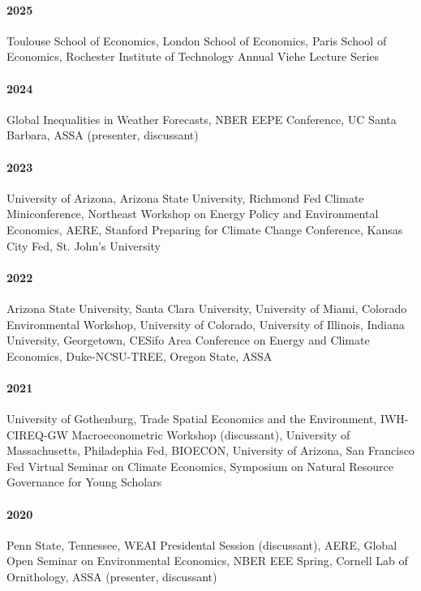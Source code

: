 \documentclass[11pt]{res} %
\begin{document}
\begin{resume}
\paragraph{2025} Toulouse School of Economics, London School of Economics, Paris School of Economics, Rochester Institute of Technology Annual Viehe Lecture Series \vspace{-.2in}
\paragraph{2024} Global Inequalities in Weather Forecasts, NBER EEPE Conference, UC Santa Barbara, ASSA (presenter, discussant) \vspace{-.2in}
\paragraph{2023} University of Arizona, Arizona State University, Richmond Fed Climate Miniconference, Northeast Workshop on Energy Policy and Environmental Economics, AERE, Stanford Preparing for Climate Change Conference, Kansas City Fed, St. John's University \vspace{-.2in}
\paragraph{2022} Arizona State University, Santa Clara University, University of Miami, Colorado Environmental Workshop, University of Colorado, University of Illinois, Indiana University, Georgetown, CESifo Area Conference on Energy and Climate Economics, Duke-NCSU-TREE, Oregon State, ASSA \vspace{-.2in}
\paragraph{2021} University of Gothenburg, Trade Spatial Economics and the Environment, IWH-CIREQ-GW Macroeconometric Workshop (discussant), University of Massachusetts, Philadephia Fed, BIOECON, University of Arizona, San Francisco Fed Virtual Seminar on Climate Economics, Symposium on Natural Resource Governance for Young Scholars \vspace{-.2in}
\paragraph{2020} Penn State, Tennessee, WEAI Presidental Session (discussant), AERE, Global Open Seminar on Environmental Economics, NBER EEE Spring, Cornell Lab of Ornithology, ASSA (presenter, discussant) \vspace{-.2in}

\end{resume}
\end{document}
